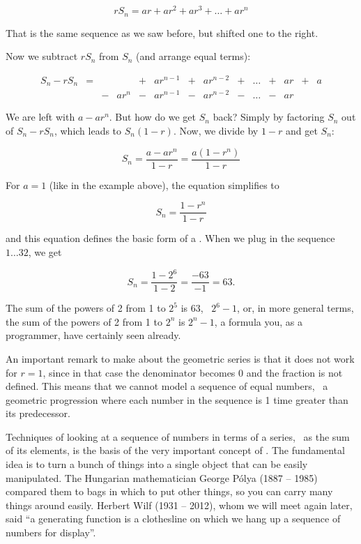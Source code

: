 \documentclass{scrreprt}
\begin{document}
\begin{equation}
rS_n=ar + ar^2 + ar^3 + \dots + ar^n
\end{equation}

That is the same sequence as we saw before,
but shifted one to the right.

Now we subtract $rS_n$ from $S_n$ (and arrange equal terms):

\begin{equation}
\begin{array}{lcclclclccclcl}
 S_n-rS_n  &=&   &      & + & ar^{n-1} & + & ar^{n-2} & + & \dots & + & ar & + & a \\
           & & - & ar^n & - & ar^{n-1} & - & ar^{n-2} & - & \dots & - & ar &   &
\end{array}
\end{equation}

We are left with $a-ar^n$.
But how do we get $S_n$ back?
Simply by factoring $S_n$ out of $S_n-rS_n$, which leads to
$S_n(1-r)$.
Now, we divide by $1-r$ and get $S_n$:

\begin{equation}
S_n = \frac{a-ar^n}{1-r} = \frac{a(1-r^n)}{1-r}
\end{equation}

For $a=1$ (like in the example above),
the equation simplifies to

\begin{equation}
S_n = \frac{1-r^n}{1-r}
\end{equation}

and this equation defines the basic form of a .
When we plug in the sequence $1\dots 32$, we get

\begin{equation}
S_n = \frac{1-2^6}{1-2} = \frac{-63}{-1} = 63.
\end{equation}

The sum of the powers of 2 from 1 to $2^5$ is 63,
\ie\ $2^6-1$, or, in more general terms,
the sum of the powers of 2 from 1 to $2^n$ is
$2^n-1$, a formula you, as a programmer,
have certainly seen already.

An important remark to make about the geometric series is
that it does not work for $r=1$, since in that case
the denominator becomes 0 and the fraction is not defined.
This means that we cannot model a sequence of equal numbers,
\ie\ a geometric progression where each number in the sequence
is 1 time greater than its predecessor.

Techniques of looking at a sequence of numbers
in terms of a series,
\ie\ as the sum of its elements, is the basis of
the very important concept of
.
The fundamental idea is to turn a bunch of things
into a single object that can be easily manipulated.
The Hungarian mathematician George Pólya (1887 -- 1985)
compared them to bags in which to put other things,
so you can carry many things around easily.
Herbert Wilf (1931 -- 2012), whom we will meet again later,
said ``a generating function is a clothesline
on which we hang up a sequence of numbers for display''.
\end{document}

